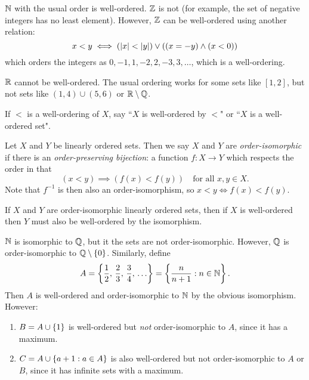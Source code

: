 \documentclass{article}
\begin{document}
\begin{example}
    $\mathbb{N}$ with the usual order is well-ordered. $\mathbb{Z}$ is not (for example, the set of negative integers has no least element). However, $\mathbb{Z}$ can be well-ordered using another relation:
    \[
	x < y \iff (\left\lvert x \right\rvert < \left\lvert y \right\rvert) \lor ((x = -y) \land (x<0))
	\]
	which orders the integers as $0, -1, 1, -2, 2, -3, 3, \dots$, which is a well-ordering.
	
	$\mathbb{R}$ cannot be well-ordered. The usual ordering works for some sets like $[1, 2]$, but not sets like $(1, 4) \cup (5, 6)$ or $\mathbb{R} \setminus \mathbb{Q}$.
\end{example}

\begin{note}
	If $<$ is a well-ordering of $X$,  say ``$X$ is well-ordered by $<$" or ``$X$ is a well-ordered set".
\end{note}

\begin{definition}
	\label{definition-order-isomorphism}
    Let $X$ and $Y$ be linearly ordered sets. Then we say $X$ and $Y$ are \textit{order-isomorphic} if there is an \textit{order-preserving bijection}: a function $f : X \to Y$ which respects the order in that
    \[
	(x < y) \implies (f(x) < f(y)) \quad \text{for all $x, y \in X$}.
	\]
	Note that $f^{-1}$ is then also an order-isomorphism, so $x < y \iff f(x) < f(y)$.
\end{definition}

\begin{corollary}
    If $X$ and $Y$ are order-isomorphic linearly ordered sets, then if $X$ is well-ordered then $Y$ must also be well-ordered by the isomorphism.
\end{corollary}

\begin{example}
	\label{example-order-isomorphism}
    $\mathbb{N}$ is isomorphic to $\mathbb{Q}$, but it the sets are not order-isomorphic. However, $\mathbb{Q}$ is order-isomorphic to $\mathbb{Q} \setminus \left\lbrace 0 \right\rbrace$. Similarly, define
    \[
	A = \set{\frac{1}{2}, \, \frac{2}{3}, \, \frac{3}{4}, \, \dots } = \set{\frac{n}{n+1} : \ninn}.
	\]
	Then $A$ is well-ordered and order-isomorphic to $\mathbb{N}$ by the obvious isomorphism. However:
	\begin{enumerate}
    	\item $B = A \cup \left\lbrace 1 \right\rbrace$ is well-ordered but \textit{not} order-isomorphic to $A$, since it has a maximum.
    	\item $C = A \cup \left\lbrace a + 1: a \in A \right\rbrace$ is also well-ordered but not order-isomorphic to $A$ or $B$, since it has infinite sets with a maximum.
	\end{enumerate}
\end{example}
\end{document}
